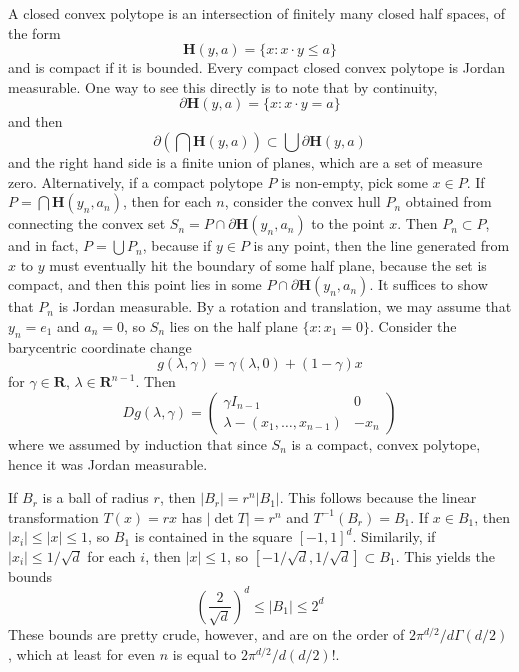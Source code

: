 \begin{example}
  A closed convex polytope is an intersection of finitely many closed half spaces, of the form
  \[ \mathbf{H}(y,a) = \{ x: x \cdot y \leq a \} \]
  and is compact if it is bounded. Every compact closed convex polytope is Jordan measurable. One way to see this directly is to note that by continuity,
  \[ \partial \mathbf{H}(y,a) = \{ x: x \cdot y = a \} \]
  and then
  \[ \partial \left(\bigcap \mathbf{H}(y,a)\right) \subset \bigcup \partial \mathbf{H}(y,a) \]
  and the right hand side is a finite union of planes, which are a set of measure zero. Alternatively, if a compact polytope $P$ is non-empty, pick some $x \in P$. If $P = \bigcap \mathbf{H}(y_n,a_n)$, then for each $n$, consider the convex hull $P_n$ obtained from connecting the convex set $S_n = P \cap \partial \mathbf{H}(y_n,a_n)$ to the point $x$. Then $P_n \subset P$, and in fact, $P = \bigcup P_n$, because if $y \in P$ is any point, then the line generated from $x$ to $y$ must eventually hit the boundary of some half plane, because the set is compact, and then this point lies in some $P \cap \partial \mathbf{H}(y_n,a_n)$. It suffices to show that $P_n$ is Jordan measurable. By a rotation and translation, we may assume that $y_n = e_1$ and $a_n = 0$, so $S_n$ lies on the half plane $\{ x : x_1 = 0 \}$. Consider the barycentric coordinate change
  \[ g(\lambda, \gamma) = \gamma (\lambda, 0) + (1 - \gamma) x \]
  for $\gamma \in \mathbf{R}$, $\lambda \in \mathbf{R}^{n-1}$. Then
  \[ Dg(\lambda, \gamma) = \begin{pmatrix} \gamma I_{n-1} & 0 \\ \lambda - (x_1,\dots,x_{n-1}) & -x_n \end{pmatrix} \]
  where we assumed by induction that since $S_n$ is a compact, convex polytope, hence it was Jordan measurable.
\end{example}

\begin{example}
  If $B_r$ is a ball of radius $r$, then $|B_r| = r^n |B_1|$. This follows because the linear transformation $T(x) = rx$ has $|\det T| = r^n$ and $T^{-1}(B_r) = B_1$. If $x \in B_1$, then $|x_i| \leq |x| \leq 1$, so $B_1$ is contained in the square $[-1,1]^d$. Similarily, if $|x_i| \leq 1/\sqrt{d}$ for each $i$, then $|x| \leq 1$, so $[-1/\sqrt{d},1/\sqrt{d}] \subset B_1$. This yields the bounds
  \[ \left( \frac{2}{\sqrt{d}} \right)^d \leq |B_1| \leq 2^d \]
  These bounds are pretty crude, however, and are on the order of $2\pi^{d/2}/d \Gamma(d/2)$, which at least for even $n$ is equal to $2\pi^{d/2}/d (d/2)!$.  
\end{example}


